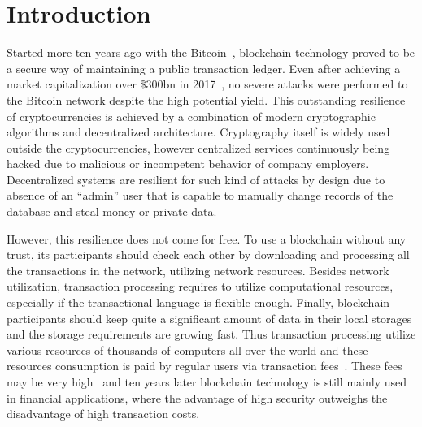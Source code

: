 \section{Introduction}
\label{sec:intro}


Started more ten years ago with the Bitcoin~\cite{nakamoto2008bitcoin}, blockchain technology proved
to be a secure way of maintaining a public transaction ledger.
Even after achieving a market capitalization over \$300bn in 2017~\cite{btcPrice},
no severe attacks were performed to the Bitcoin network despite the high potential yield.
This outstanding resilience of cryptocurrencies is achieved by a combination of modern cryptographic algorithms
and decentralized architecture.
Cryptography itself is widely used outside the cryptocurrencies, however centralized services continuously
being hacked\cite{sanger2015bank,leskin2018top} due to malicious or incompetent behavior of company employers.
Decentralized systems are resilient for such kind of attacks by design due to absence of an ``admin'' user
that is capable to manually change records of the database and steal money or private data.

However, this resilience does not come for free.
To use a blockchain without any trust, its participants should check each other by downloading and
processing all the transactions in the network, utilizing network resources.
Besides network utilization, transaction processing requires to utilize computational resources,
especially if the transactional language is flexible enough.
Finally, blockchain participants should keep quite a significant amount of data in their local storages and
the storage requirements are growing fast.
Thus transaction processing utilize various resources of thousands of computers all over the world
and these resources consumption is paid by regular users via transaction fees~\cite{chepurnoy2018systematic}.
These fees may be very high~\cite{bitcoinFees}
and ten years later blockchain technology is still mainly used in financial applications, where the advantage of
high security outweighs the disadvantage of high transaction costs.

